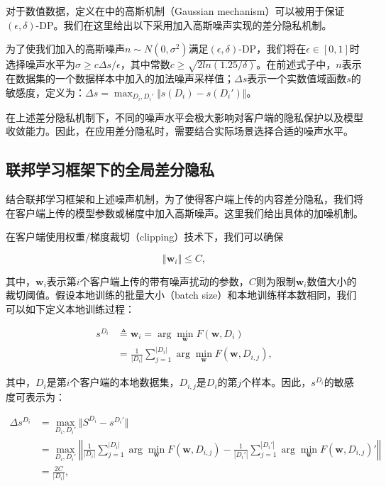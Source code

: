 对于数值数据，定义在\parencite{dwork2014algorithmic}中的高斯机制（Gaussian mechanism）可以被用于保证$(\epsilon, \delta)$-DP。我们在这里给出以下采用加入高斯噪声实现的差分隐私机制。

为了使我们加入的高斯噪声$n\sim N(0, \sigma^2)$满足$(\epsilon, \delta)$-DP，我们将在$\epsilon \in [0, 1]$时选择噪声水平为$\sigma \ge c \Delta s / \epsilon$，其中常数$c \ge \sqrt{2ln(1.25/\delta)}$。在前述式子中，$n$表示在数据集的一个数据样本中加入的加法噪声采样值；$\Delta s$表示一个实数值域函数$s$的敏感度，定义为：$\Delta s = \max_{D_i, D_i'} \Vert s(D_i) - s(D_i')\Vert $。

在上述差分隐私机制下，不同的噪声水平会极大影响对客户端的隐私保护以及模型收敛能力。因此，在应用差分隐私时，需要结合实际场景选择合适的噪声水平。

\subsection{联邦学习框架下的全局差分隐私}

结合联邦学习框架和上述噪声机制，为了使得客户端上传的内容差分隐私，我们将在客户端上传的模型参数或梯度中加入高斯噪声。这里我们给出具体的加噪机制。

在客户端使用权重/梯度裁切（clipping）技术下，我们可以确保

\begin{equation}
  \Vert\mathbf{w}_i\Vert \le C,
\end{equation}

其中，$\mathbf{w}_i$表示第$i$个客户端上传的带有噪声扰动的参数，$C$则为限制$\mathbf{w}_i$数值大小的裁切阈值。假设本地训练的批量大小（batch size）和本地训练样本数相同，我们可以如下定义本地训练过程：

\begin{equation}
  \begin{aligned}
  s^{D_i} &\triangleq \mathbf{w}_i = \arg \min_{\mathbf{w}} F(\mathbf{w}, D_i) \\
      &=  \frac{1}{|D_i|}\sum_{j = 1}^{|D_i|} \arg \min_{\mathbf{w}} F(\mathbf{w}, D_{i,j}),
  \end{aligned}
\end{equation}

其中，$D_i$是第$i$个客户端的本地数据集，$D_{i, j}$是$D_i$的第$j$个样本。因此，$s^{D_i}$的敏感度可表示为：

\begin{equation}
  \begin{aligned}
  \Delta s^{D_i} &= \max_{D_i, D_i'} \Vert S^{D_i} - s^{D_i'}\Vert\\
  &= \max_{D_i, D_i'} \left\Vert \frac{1}{|D_i|}\sum_{j = 1}^{|D_i|} \arg \min_{\mathbf{w}} F(\mathbf{w}, D_{i,j}) - \frac{1}{|D_i'|}\sum_{j = 1}^{|D_i'|} \arg \min_{\mathbf{w}} F(\mathbf{w}, D_{i,j})'\right\Vert \\
  &= \frac{2C} {|D_i|}, 
  \end{aligned}
\end{equation}

